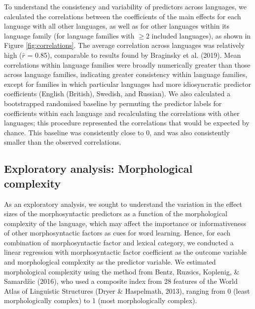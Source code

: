\documentclass[10pt, letterpaper]{article}
\begin{document}
To understand the consistency and variability of predictors across
languages, we calculated the correlations between the coefficients of
the main effects for each language with all other languages, as well as
for other languages within its language family (for language families
with \(\ge 2\) included languages), as shown in Figure
\ref{fig:correlations}. The average correlation across languages was
relatively high (\(\bar{r}\) = 0.85), comparable to results found by
Braginsky et al. (2019). Mean correlations within language families were
broadly numerically greater than those across language families,
indicating greater consistency within language families, except for
families in which particular languages had more idiosyncratic predictor
coefficients (English (British), Swedish, and Russian). We also
calculated a bootstrapped randomised baseline by permuting the predictor
labels for coefficients within each language and recalculating the
correlations with other languages; this procedure represented the
correlations that would be expected by chance. This baseline was
consistently close to 0, and was also consistently smaller than the
observed correlations.

\hypertarget{exploratory-analysis-morphological-complexity}{%
\subsection{Exploratory analysis: Morphological
complexity}\label{exploratory-analysis-morphological-complexity}}

As an exploratory analysis, we sought to understand the variation in the
effect sizes of the morphosyntactic predictors as a function of the
morphological complexity of the language, which may affect the
importance or informativeness of other morphosyntactic factors as cues
for word learning. Hence, for each combination of morphosyntactic factor
and lexical category, we conducted a linear regression with
morphosyntactic factor coefficient as the outcome variable and
morphological complexity as the predictor variable. We estimated
morphological complexity using the method from Bentz, Ruzsics, Koplenig,
\& Samardžic (2016), who used a composite index from 28 features of the
World Atlas of Linguistic Structures (Dryer \& Haspelmath, 2013),
ranging from 0 (least morphologically complex) to 1 (most
morphologically complex).
\end{document}
